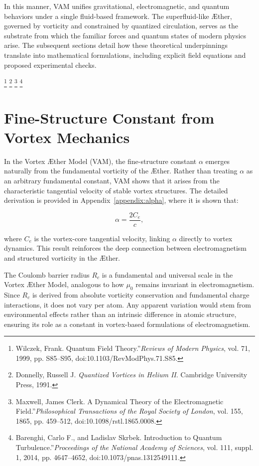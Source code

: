\documentclass[a4paper,12pt]{article}
\begin{document}
In this manner, VAM unifies gravitational, electromagnetic, and quantum behaviors under a single fluid-based framework. The superfluid-like Æther, governed by vorticity and constrained by quantized circulation, serves as the substrate from which the familiar forces and quantum states of modern physics arise. The subsequent sections detail how these theoretical underpinnings translate into mathematical formulations, including explicit field equations and proposed experimental checks.

\footnote{Wilczek, Frank. \grqq Quantum Field Theory.\textquotedblright \textit{Reviews of Modern Physics}, vol. 71, 1999, pp. S85–S95, doi:10.1103/RevModPhys.71.S85.}
\footnote{Donnelly, Russell J. \textit{Quantized Vortices in Helium II}. Cambridge University Press, 1991.}
\footnote{Maxwell, James Clerk. \grqq A Dynamical Theory of the Electromagnetic Field.\textquotedblright \textit{Philosophical Transactions of the Royal Society of London}, vol. 155, 1865, pp. 459–512, doi:10.1098/rstl.1865.0008.}
\footnote{Barenghi, Carlo F., and Ladislav Skrbek. \grqq Introduction to Quantum Turbulence.\textquotedblright \textit{Proceedings of the National Academy of Sciences}, vol. 111, suppl. 1, 2014, pp. 4647–4652, doi:10.1073/pnas.1312549111.}



\section{Fine-Structure Constant from Vortex Mechanics}

In the Vortex Æther Model (VAM), the fine-structure constant $\alpha$ emerges naturally from the fundamental vorticity of the Æther. Rather
than treating $\alpha$ as an arbitrary fundamental constant, VAM shows that it arises from the characteristic tangential velocity of stable vortex
structures. The detailed derivation is provided in Appendix~\ref{appendix:alpha}, where it is shown that:

\begin{equation}
    \alpha = \frac{2 C_e}{c},
\end{equation}

where $C_e$ is the vortex-core tangential velocity, linking $\alpha$ directly to vortex dynamics. This result reinforces the deep connection between electromagnetism and structured vorticity in the Æther.


The Coulomb barrier radius \(R_c\) is a fundamental and universal scale in the Vortex Æther Model, analogous to how \(\mu_0\) remains invariant in electromagnetism. Since \(R_c\) is derived from absolute vorticity conservation and fundamental charge interactions, it does not vary per atom. Any apparent variation would stem from environmental effects rather than an intrinsic difference in atomic structure, ensuring its role as a constant in vortex-based formulations of electromagnetism.
\end{document}
